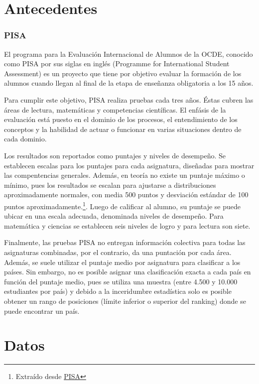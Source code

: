 \documentclass[
]{article}
\begin{document}
\hypertarget{antecedentes}{%
\section{Antecedentes}\label{antecedentes}}

\hypertarget{pisa}{%
\subsubsection{PISA}\label{pisa}}

El programa para la Evaluación Internacional de Alumnos de la OCDE,
conocido como PISA por sus siglas en inglés (Programme for International
Student Assessment) es un proyecto que tiene por objetivo evaluar la
formación de los alumnos cuando llegan al final de la etapa de enseñanza
obligatoria a los 15 años.

Para cumplir este objetivo, PISA realiza pruebas cada tres años. Éstas
cubren las áreas de lectura, matemáticas y competencias científicas. El
enfásis de la evaluación está puesto en el dominio de los procesos, el
entendimiento de los conceptos y la habilidad de actuar o funcionar en
varias situaciones dentro de cada dominio.

Los resultados son reportados como puntajes y niveles de desempeño. Se
establecen escalas para los puntajes para cada asignatura, diseñadas
para mostrar las compentencias generales. Además, en teoría no existe un
puntaje máximo o mínimo, pues los resultados se escalan para ajustarse a
distribuciones aproximadamente normales, con media 500 puntos y
desviación estándar de 100 puntos aproximadamente.\footnote{Extraído
  desde \href{https://www.oecd.org/pisa/pisafaq/}{PISA}}. Luego de
calificar al alumno, su puntaje se puede ubicar en una escala adecuada,
denominada niveles de desempeño. Para matemática y ciencias se
establecen seis niveles de logro y para lectura son siete.

Finalmente, las pruebas PISA no entregan información colectiva para
todas las asignaturas combinadas, por el contrario, da una puntación por
cada área. Además, se suele utilizar el puntaje medio por asignatura
para clasificar a los países. Sin embargo, no es posible asignar una
clasificación exacta a cada país en función del puntaje medio, pues se
utiliza una muestra (entre 4.500 y 10.000 estudiantes por país) y debido
a la inceridumbre estadística solo es posible obtener un rango de
posiciones (límite inferior o superior del ranking) donde se puede
encontrar un país.

\hypertarget{datos}{%
\section{Datos}\label{datos}}
\end{document}

